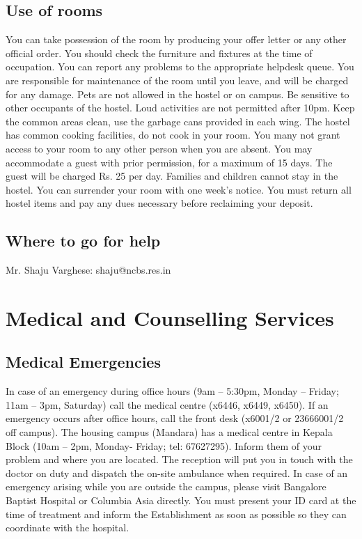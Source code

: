 \documentclass[a4paper,10pt]{article}
\begin{document}
\subsection{Use of rooms}
You can take possession of the room by producing your offer letter or any
other official order. You should check the furniture and fixtures at the time of occupation.
You can report any problems to the appropriate helpdesk queue. You are responsible for
maintenance of the room until you leave, and will be charged for any damage. Pets are not
allowed in the hostel or on campus. Be sensitive to other occupants of the hostel. Loud
activities are not permitted after 10pm. Keep the common areas clean, use the garbage cans
provided in each wing. The hostel has common cooking facilities, do not cook in your room.
You many not grant access to your room to any other person when you are absent. You may
accommodate a guest with prior permission, for a maximum of 15 days. The guest will be
charged Rs. 25 per day. Families and children cannot stay in the hostel. You can surrender
your room with one week’s notice. You must return all hostel items and pay any dues
necessary before reclaiming your deposit.

\subsection{Where to go for help}
Mr. Shaju Varghese: shaju@ncbs.res.in

\section{Medical and Counselling Services}

\subsection{Medical Emergencies} In case of an emergency during office hours
(9am – 5:30pm, Monday – Friday; 11am – 3pm, Saturday) call the medical centre
(x6446, x6449, x6450). If an emergency occurs after office hours, call the front
desk (x6001/2 or 23666001/2 off campus).	
The housing campus (Mandara) has a medical centre in Kepala Block (10am –
2pm, Monday- Friday; tel: 67627295). Inform them of your problem and where you are
located. The reception will put you in touch with the doctor on duty and dispatch the on-site
ambulance when required. In case of an emergency arising while you are outside the
campus, please visit Bangalore Baptist Hospital or Columbia Asia directly. You must
present your ID card at the time of treatment and inform the Establishment as soon as
possible so they can coordinate with the hospital.
\end{document}

